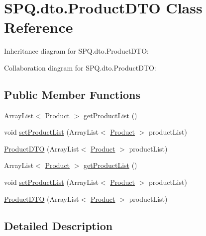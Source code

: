 \hypertarget{class_s_p_q_1_1dto_1_1_product_d_t_o}{}\section{S\+P\+Q.\+dto.\+Product\+D\+TO Class Reference}
\label{class_s_p_q_1_1dto_1_1_product_d_t_o}


Inheritance diagram for S\+P\+Q.\+dto.\+Product\+D\+TO\+:


Collaboration diagram for S\+P\+Q.\+dto.\+Product\+D\+TO\+:
\subsection*{Public Member Functions}
\begin{DoxyCompactItemize}
\item 
Array\+List$<$ \mbox{\hyperlink{class_s_p_q_1_1data_1_1_product}{Product}} $>$ \mbox{\hyperlink{class_s_p_q_1_1dto_1_1_product_d_t_o_a4b7df5983f4342285d495a335fb9019f}{get\+Product\+List}} ()
\item 
void \mbox{\hyperlink{class_s_p_q_1_1dto_1_1_product_d_t_o_a79be4bcc432ec5c17c5873e868aa2e4f}{set\+Product\+List}} (Array\+List$<$ \mbox{\hyperlink{class_s_p_q_1_1data_1_1_product}{Product}} $>$ product\+List)
\item 
\mbox{\hyperlink{class_s_p_q_1_1dto_1_1_product_d_t_o_a206290d64e728a8838485f958bee2c29}{Product\+D\+TO}} (Array\+List$<$ \mbox{\hyperlink{class_s_p_q_1_1data_1_1_product}{Product}} $>$ product\+List)
\item 
Array\+List$<$ \mbox{\hyperlink{class_s_p_q_1_1data_1_1_product}{Product}} $>$ \mbox{\hyperlink{class_s_p_q_1_1dto_1_1_product_d_t_o_a4b7df5983f4342285d495a335fb9019f}{get\+Product\+List}} ()
\item 
void \mbox{\hyperlink{class_s_p_q_1_1dto_1_1_product_d_t_o_a79be4bcc432ec5c17c5873e868aa2e4f}{set\+Product\+List}} (Array\+List$<$ \mbox{\hyperlink{class_s_p_q_1_1data_1_1_product}{Product}} $>$ product\+List)
\item 
\mbox{\hyperlink{class_s_p_q_1_1dto_1_1_product_d_t_o_a206290d64e728a8838485f958bee2c29}{Product\+D\+TO}} (Array\+List$<$ \mbox{\hyperlink{class_s_p_q_1_1data_1_1_product}{Product}} $>$ product\+List)
\end{DoxyCompactItemize}


\subsection{Detailed Description}


